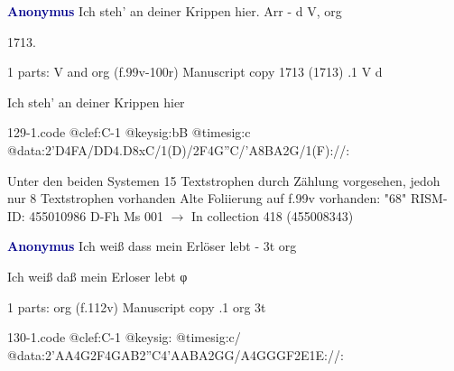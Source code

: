 \documentclass[twocolumn]{book}
\begin{document}
\newline \par \vspace{7pt} \textcolor{darkblue}{\textbf{Anonymus  }}
\newline Ich steh' an deiner Krippen hier. Arr - d
\newline V, org
\newline \begin{itshape} 1713.\end{itshape} 
\newline \textcolor{darkblue}{}  1 parts: V and org  (f.99v-100r)
\newline Manuscript copy  1713 (1713)
.1  V  d
\newline \begin{footnotesize} Ich steh' an deiner Krippen hier \end{footnotesize}  
\begin{filecontents*}{129-1.code}
@clef:C-1
@keysig:bB
@timesig:c
@data:2'D4FA/DD4.D8xC/1(D)/2F4G''C/'A{8BA}2G/1(F)://:
\end{filecontents*}
\newline
%

\newline Unter den beiden Systemen 15 Textstrophen durch Zählung vorgesehen, jedoh nur 8 Textstrophen vorhanden
\newline Alte Foliierung auf f.99v vorhanden: "68"
\newline RISM-ID: 455010986
\newline D-Fh  Ms 001
\newline $\rightarrow$ In collection 418 (455008343)
      
\newline \par \vspace{7pt} \textcolor{darkblue}{\textbf{Anonymus  }}
\newline Ich weiß dass mein Erlöser lebt - 3t
\newline org
\newline \begin{itshape}[f.112v, heading:] Ich weiß daß mein Erloser lebt φ\end{itshape} 
\newline \textcolor{darkblue}{}  1 parts: org  (f.112v)
\newline Manuscript copy
.1  org  3t  
\begin{filecontents*}{130-1.code}
@clef:C-1
@keysig:
@timesig:c/
@data:2'AA4G2F4GAB2''C4'AABA2GG/A4GGGF2E1E://:
\end{filecontents*}
\newline
%
\end{document}
